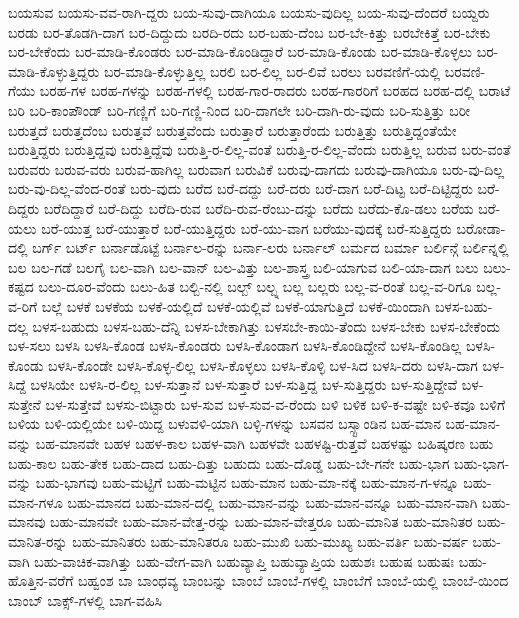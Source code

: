 {ಬಯಸುವ
ಬಯಸು-ವವ-ರಾಗಿ-ದ್ದರು
ಬಯ-ಸುವು-ದಾಗಿಯೂ
ಬಯಸು-ವುದಿಲ್ಲ
ಬಯ-ಸುವು-ದೆಂದರೆ
ಬಯ್ದರು
ಬರಡು
ಬರ-ತೊಡಗಿ-ದಾಗ
ಬರ-ದಿದ್ದುದು
ಬರದಿ-ರದು
ಬರ-ಬಹು-ದೆಂಬ
ಬರ-ಬೇ-ಕಿತ್ತು
ಬರಬೇಕಿತ್ತೆ
ಬರ-ಬೇಕು
ಬರ-ಬೇಕೆಂದು
ಬರ-ಮಾಡಿ-ಕೊಂಡರು
ಬರ-ಮಾಡಿ-ಕೊಂಡಿದ್ದಾರೆ
ಬರ-ಮಾಡಿ-ಕೊಂಡು
ಬರ-ಮಾಡಿ-ಕೊಳ್ಳಲು
ಬರ-ಮಾಡಿ-ಕೊಳ್ಳುತ್ತಿದ್ದರು
ಬರ-ಮಾಡಿ-ಕೊಳ್ಳುತ್ತಿಲ್ಲ
ಬರಲಿ
ಬರ-ಲಿಲ್ಲ
ಬರ-ಲಿವೆ
ಬರಲು
ಬರವಣಿಗೆ-ಯಲ್ಲಿ
ಬರವಣಿ-ಗೆಯು
ಬರಹ-ಗಳ
ಬರಹ-ಗಳನ್ನು
ಬರಹ-ಗಳಲ್ಲಿ
ಬರಹ-ಗಾರ-ರಾದರು
ಬರಹ-ಗಾರರಿಗೆ
ಬರಹದ
ಬರಹ-ದಲ್ಲಿ
ಬರಾಟೆ
ಬರಿ
ಬರಿ-ಕಾಂಪೌಂಡ್
ಬರಿ-ಗಣ್ಣಿಗೆ
ಬರಿ-ಗಣ್ಣಿ-ನಿಂದ
ಬರಿ-ದಾಗಲೇ
ಬರಿ-ದಾಗಿ-ರು-ವುದು
ಬರಿ-ಸುತ್ತಿತ್ತು
ಬರೀ
ಬರುತ್ತದೆ
ಬರುತ್ತದೆಂಬ
ಬರುತ್ತವೆ
ಬರುತ್ತವೆಂದು
ಬರುತ್ತಾರೆ
ಬರುತ್ತಾರೆಂದು
ಬರುತ್ತಿತ್ತು
ಬರುತ್ತಿದ್ದಂತೆಯೇ
ಬರುತ್ತಿದ್ದರು
ಬರುತ್ತಿದ್ದವು
ಬರುತ್ತಿದ್ದೆವು
ಬರುತ್ತಿ-ರ-ಲಿಲ್ಲ-ವಂತೆ
ಬರುತ್ತಿ-ರ-ಲಿಲ್ಲ-ವೆಂದು
ಬರುತ್ತಿಲ್ಲ
ಬರುವ
ಬರು-ವಂತೆ
ಬರುವರು
ಬರುವ-ವರು
ಬರುವ-ಹಾಗಿಲ್ಲ
ಬರುವಾಗ
ಬರುವಿಕೆ
ಬರುವು-ದಾಗದು
ಬರುವು-ದಾಗಿಯೂ
ಬರು-ವು-ದಿಲ್ಲ
ಬರು-ವು-ದಿಲ್ಲ-ವೆಂದ-ರಂತೆ
ಬರು-ವುದು
ಬರೆದ
ಬರೆ-ದದ್ದು
ಬರೆ-ದರು
ಬರೆ-ದಾಗ
ಬರೆ-ದಿಟ್ಟ
ಬರೆ-ದಿಟ್ಟಿದ್ದರು
ಬರೆ-ದಿದ್ದರು
ಬರೆದಿದ್ದಾರೆ
ಬರೆ-ದಿದ್ದು
ಬರೆದಿ-ರುವ
ಬರೆದಿ-ರುವ-ರೆಂಬು-ದನ್ನು
ಬರೆದು
ಬರೆದು-ಕೊ-ಡಲು
ಬರೆಯ
ಬರೆ-ಯಲು
ಬರೆ-ಯುತ್ತ
ಬರೆ-ಯುತ್ತಾರೆ
ಬರೆ-ಯುತ್ತಿದ್ದರು
ಬರೆ-ಯು-ವಾಗ
ಬರೆಯು-ವುದಕ್ಕೆ
ಬರೆ-ಸುತ್ತಿದ್ದರು
ಬರೋಡಾ-ದಲ್ಲಿ
ಬರ್ಗ್
ಬರ್ಟ್
ಬರ್ನಾಡೊಟ್ಟೆ
ಬರ್ನಾಲ-ರನ್ನು
ಬರ್ನಾ-ಲರು
ಬರ್ನಾಲ್
ಬರ್ಮದ
ಬರ್ಮಾ
ಬರ್ಲಿನ್ಗೆ
ಬರ್ಲಿನ್ನಲ್ಲಿ
ಬಲ
ಬಲ-ಗಡೆ
ಬಲಗೈ
ಬಲ-ವಾಗಿ
ಬಲ-ವಾನ್
ಬಲ-ವಿತ್ತು
ಬಲ-ಶಾಸ್ತ್ರ
ಬಲಿ-ಯಾಗುವ
ಬಲಿ-ಯಾ-ದಾಗ
ಬಲು
ಬಲು-ಕಷ್ಟದ
ಬಲು-ದೂರ-ವೆಂದು
ಬಲು-ಹಿತ
ಬಲ್ಬಿ-ನಲ್ಲಿ
ಬಲ್ಬ್
ಬಲ್ಬ್ನ
ಬಲ್ಲ
ಬಲ್ಲರು
ಬಲ್ಲ-ವ-ರಂತೆ
ಬಲ್ಲ-ವ-ರಿಗೂ
ಬಲ್ಲ-ವ-ರಿಗೆ
ಬಲ್ಲೆ
ಬಳಕೆ
ಬಳಕೆಯ
ಬಳಕೆ-ಯಲ್ಲಿದೆ
ಬಳಕೆ-ಯಲ್ಲಿವೆ
ಬಳಕೆ-ಯಾಗುತ್ತಿದೆ
ಬಳಕೆ-ಯಿಂದಾಗಿ
ಬಳಸ-ಬಹು-ದಲ್ಲ
ಬಳಸ-ಬಹುದು
ಬಳಸ-ಬಹು-ದೆನ್ನಿ
ಬಳಸ-ಬೇಕಾಗಿತ್ತು
ಬಳಸಬೇ-ಕಾಯಿ-ತೆಂದು
ಬಳಸ-ಬೇಕು
ಬಳಸ-ಬೇಕೆಂದು
ಬಳ-ಸಲು
ಬಳಸಿ
ಬಳಸಿ-ಕೊಂಡ
ಬಳಸಿ-ಕೊಂಡರು
ಬಳಸಿ-ಕೊಂಡಾಗ
ಬಳಸಿ-ಕೊಂಡಿದ್ದೇನೆ
ಬಳಸಿ-ಕೊಂಡಿಲ್ಲ
ಬಳಸಿ-ಕೊಂಡು
ಬಳಸಿ-ಕೊಂಡೇ
ಬಳಸಿ-ಕೊಳ್ಳ-ಲಿಲ್ಲ
ಬಳಸಿ-ಕೊಳ್ಳಲು
ಬಳಸಿ-ಕೊಳ್ಳಿ
ಬಳ-ಸಿದ
ಬಳಸಿ-ದರು
ಬಳಸಿ-ದಾಗ
ಬಳ-ಸಿದ್ದೆ
ಬಳಸಿಯೇ
ಬಳಸಿ-ರ-ಲಿಲ್ಲ
ಬಳ-ಸುತ್ತಾನೆ
ಬಳ-ಸುತ್ತಾರೆ
ಬಳ-ಸುತ್ತಿದ್ದ
ಬಳ-ಸುತ್ತಿದ್ದರು
ಬಳ-ಸುತ್ತಿದ್ದೇವೆ
ಬಳ-ಸುತ್ತೇನೆ
ಬಳ-ಸುತ್ತೇವೆ
ಬಳಸು-ಬಿಟ್ಟಾರು
ಬಳ-ಸುವ
ಬಳ-ಸುವ-ವ-ರೆಂದು
ಬಳಿ
ಬಳಿಕ
ಬಳಿ-ಕ-ವಷ್ಟೇ
ಬಳಿ-ಕವೂ
ಬಳಿಗೆ
ಬಳಿಯ
ಬಳಿ-ಯಲ್ಲಿಯೇ
ಬಳಿ-ಯಿದ್ದ
ಬಳುವಳಿ-ಯಾಗಿ
ಬಳ್ಳಿ-ಗಳನ್ನು
ಬಸವನ
ಬಸ್ಸ್ಟಾಂಡಿನ
ಬಹ-ಮಾನ
ಬಹ-ಮಾನ-ವನ್ನು
ಬಹ-ಮಾನವೇ
ಬಹಳ
ಬಹಳ-ಕಾಲ
ಬಹಳ-ವಾಗಿ
ಬಹಳವೇ
ಬಹಳಷ್ಟಿ-ರುತ್ತವೆ
ಬಹಳಷ್ಟು
ಬಹಿಷ್ಕರಣ
ಬಹು
ಬಹು-ಕಾಲ
ಬಹು-ತೇಕ
ಬಹು-ದಾದ
ಬಹು-ದಿತ್ತು
ಬಹುದು
ಬಹು-ದೊಡ್ಡ
ಬಹು-ಬೇ-ಗನೇ
ಬಹು-ಭಾಗ
ಬಹು-ಭಾಗ-ವನ್ನು
ಬಹು-ಭಾಗವು
ಬಹು-ಮಟ್ಟಿಗೆ
ಬಹು-ಮಟ್ಟಿನ
ಬಹು-ಮಾನ
ಬಹು-ಮಾ-ನಕ್ಕೆ
ಬಹು-ಮಾನ-ಗ-ಳನ್ನೂ
ಬಹು-ಮಾನ-ಗಳೂ
ಬಹು-ಮಾನದ
ಬಹು-ಮಾನ-ದಲ್ಲಿ
ಬಹು-ಮಾನ-ವನ್ನು
ಬಹು-ಮಾನ-ವನ್ನೂ
ಬಹು-ಮಾನ-ವಾಗಿ
ಬಹು-ಮಾನವು
ಬಹು-ಮಾನವೇ
ಬಹು-ಮಾನ-ವೇತ್ತ-ರನ್ನು
ಬಹು-ಮಾನ-ವೇತ್ತರೂ
ಬಹು-ಮಾನಿತ
ಬಹು-ಮಾನಿತರ
ಬಹು-ಮಾನಿತ-ರನ್ನು
ಬಹು-ಮಾನಿತರು
ಬಹು-ಮಾನಿತರೂ
ಬಹು-ಮುಖಿ
ಬಹು-ಮುಖ್ಯ
ಬಹು-ವರ್ತಿ
ಬಹು-ವರ್ಷ
ಬಹು-ವಾಗಿ
ಬಹು-ವಾಚಿಕ-ವಾಗಿತ್ತು
ಬಹು-ವೇಗ-ವಾಗಿ
ಬಹುವ್ಯಾಪ್ತಿ
ಬಹುವ್ಯಾಪ್ತಿಯ
ಬಹುಶಃ
ಬಹುಷ
ಬಹುಷಃ
ಬಹು-ಹೊತ್ತಿನ-ವರೆಗೆ
ಬಹ್ವಂಶ
ಬಾ
ಬಾಂಧವ್ಯ
ಬಾಂಬನ್ನು
ಬಾಂಬೆ
ಬಾಂಬೆ-ಗಳಲ್ಲಿ
ಬಾಂಬೆಗೆ
ಬಾಂಬೆ-ಯಲ್ಲಿ
ಬಾಂಬೆ-ಯಿಂದ
ಬಾಂಬ್
ಬಾಕ್ಸ್-ಗಳಲ್ಲಿ
ಬಾಗ-ವಹಿಸಿ
}
